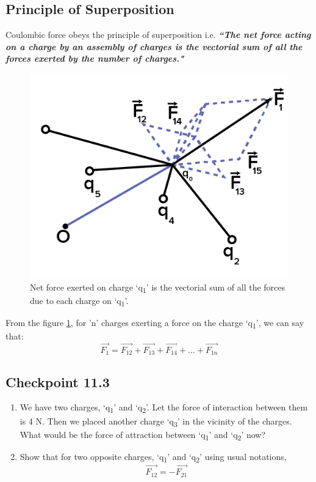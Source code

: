 \subsection{Principle of Superposition}
Coulombic force obeys the principle of superposition i.e. \textit{\textbf{``The net force acting on a charge
by an assembly of charges is the vectorial
sum of all the forces exerted by the number of charges."}}
\begin{figure}[H]
  \centering
  \captionsetup{justification = centering}
  \includegraphics[scale = 1.2]{Images/11.2.png}
  \caption{Net force exerted  on charge `q\textsubscript{1}' is 
  the vectorial sum of all the forces due to each charge on `q\textsubscript{1}'.}
  \label{fig:11.2}
\end{figure}
From the figure \ref{fig:11.2}, for 'n' charges exerting a
force on the charge `q\textsubscript{1}', we can say that:
\begin{equation}  
  \vec{F_{1}} = \vec{F_{12}} + \vec{F_{13}} + \vec{F_{14}}+...+\vec{F_{1n}} \nonumber
\end{equation}
\begin{tcolorbox}
\subsection*{Checkpoint 11.3}
\begin{enumerate}[label=(\alph*)]
  \item We have two charges, `q\textsubscript{1}' and `q\textsubscript{2}'.
  Let the force of interaction between them is 4 N. Then we placed another charge `q\textsubscript{3}' in the vicinity of the charges.
  What would be the force of attraction between `q\textsubscript{1}' and `q\textsubscript{2}' now?
  \item Show that for two opposite charges, `q\textsubscript{1}' and `q\textsubscript{2}' using usual notations,
  \begin{equation}
    \vec{F_{12}} = -\vec{F_{21}} \nonumber
  \end{equation}
\end{enumerate}
\end{tcolorbox}

